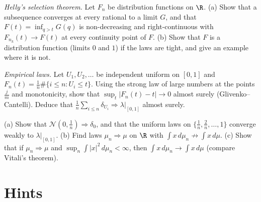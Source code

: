 \begin{exercise}[$\star\star$]\label{ex:helly}
\emph{Helly's selection theorem.} Let $F_n$ be distribution functions on $\R$. (a) Show that a subsequence converges at every rational to a limit $G$, and that $F(t)=\inf_{q>t}G(q)$ is non-decreasing and right-continuous
with $F_{n_k}(t)\to F(t)$ at every continuity point of $F$. (b) Show that $F$ is a distribution function (limits $0$ and $1$) if the laws are tight, and give an example where it is not.
\end{exercise}

\begin{exercise}[$\star\star$]\label{ex:glivenko}
\emph{Empirical laws.} Let $U_1,U_2,\ldots$ be independent uniform on $[0,1]$ and $F_n(t)=\frac1n\#\{i\le n:U_i\le t\}$. Using the strong law of large numbers at the points $\frac jm$ and monotonicity, show that
$\sup_t|F_n(t)-t|\to0$ almost surely (Glivenko--Cantelli). Deduce that $\frac1n\sum_{i\le n}\delta_{U_i}\Rightarrow\lambda|_{[0,1]}$ almost surely.
\end{exercise}

\begin{exercise}[$\star\star$]\label{ex:weakexamples}
(a) Show that $\mathcal N(0,\frac1n)\Rightarrow\delta_0$, and that the uniform laws on $\{\frac1n,\frac2n,\dots,1\}$ converge weakly to $\lambda|_{[0,1]}$. (b) Find laws $\mu_n\Rightarrow\mu$ on $\R$ with $\int x\,d\mu_n\not\to\int x\,d\mu$. (c) Show that
if $\mu_n\Rightarrow\mu$ and $\sup_n\int|x|^2\,d\mu_n<\infty$, then $\int x\,d\mu_n\to\int x\,d\mu$ (compare Vitali's theorem).
\end{exercise}

\section{Hints}

